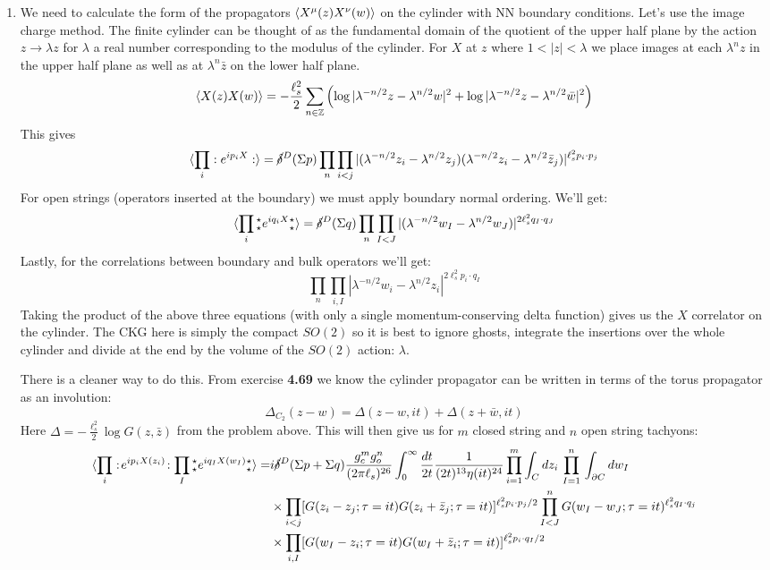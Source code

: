 \documentclass[11pt, class=article, crop=false]{standalone}
\begin{document}
\begin{enumerate}
	\item
	We need to calculate the form of the propagators $\braket{X^\mu(z) X^\nu(w)}$ on the cylinder with NN boundary conditions. Let's use the image charge method. The finite cylinder can be thought of as the fundamental domain of the quotient of the upper half plane by the action $z \to \lambda z$ for $\lambda$ a real number corresponding to the modulus of the cylinder. For $X$ at $z$ where $1<|z|<\lambda$ we place images at each $\lambda^n z$ in the upper half plane as well as at $\lambda^n \bar z$ on the lower half plane. 
	\[
		\braket{X(z) X(w)} = - \frac{\ell_s^2}{2} \sum_{n \in \mathbb{Z}} \left( \log|\lambda^{-n/2} z - \lambda^{n/2} w|^2 +  \log|\lambda^{-n/2} z - \lambda^{n/2} \bar w|^2 \right)
	\]
	This gives
	\[
		\braket{\prod_{i} :e^{i p_i X}:} = \cancel\delta^D(\Sigma p) \prod_{n} \prod_{i < j} |(\lambda^{-n/2} z_i - \lambda^{n/2} z_j) (\lambda^{-n/2} z_i - \lambda^{n/2} \bar z_j)|^{\ell_s^2 p_i \cdot p_j}
	\]
	For open strings (operators inserted at the boundary) we must apply boundary normal ordering. We'll get:
	\[
		\braket{\prod_{i} {_\star^\star} e^{i q_i X} {^\star_\star} } = \cancel\delta^D(\Sigma q) \prod_{n} \prod_{I < J} |(\lambda^{-n/2} w_I - \lambda^{n/2} w_J)|^{2 \ell_s^2 q_I \cdot q_J}
	\]	
	Lastly, for the correlations between boundary and bulk operators we'll get:
	\[
		\prod_n \prod_{i, I} |\lambda^{-n/2} w_i - \lambda^{n/2} z_i|^{2 \ell_s^2 p_i \cdot q_I}
	\]
	Taking the product of the above three equations (with only a single momentum-conserving delta function) gives us the $X$ correlator on the cylinder. The CKG here is simply the compact $SO(2)$ so it is best to ignore ghosts, integrate the insertions over the whole cylinder and divide at the end by the volume of the $SO(2)$ action: $\lambda$. 
	
	There is a cleaner way to do this. From exercise \textbf{4.69} we know the cylinder propagator can be written in terms of the torus propagator as an involution:
	\[
		\Delta_{C_2}(z- w) = \Delta(z - w, i t) + \Delta(z + \bar w, i t)
	\]
	Here $\Delta = -\frac{\ell_s^2}{2} \log G(z, \bar z)$ from the problem above. This will then give us for $m$ closed string and $n$ open string tachyons:
	\[
	\begin{aligned}
		\braket{\prod_{i} :\!e^{i p_i X(z_i)}\!: \prod_{I} {_\star^\star} e^{i q_I X(w_I)} {^\star_\star} } 
		= & i \cancel\delta^D(\Sigma p + \Sigma q) \frac{g_c^m g_o^n}{(2\pi \ell_s)^{26}} \int_0^\infty \frac{dt}{2t} \frac{1}{(2t)^{13} \eta(i t)^{24}} \prod_{i=1}^m \int_{C} dz_i \, \prod_{I=1}^n \, \int_{\partial C} dw_I  \\
		& \times \prod_{i<j} [G(z_i-z_j; \tau = it) G(z_i + \bar z_j; \tau = it)]^{\ell_s^2 p_i \cdot p_j/2}  \prod_{I<J}^n G(w_I-w_J; \tau = it)^{\ell_s^2 q_I \cdot q_j}\\
		& \times \prod_{i, I} [G(w_I - z_i; \tau = it) G(w_I + \bar z_i; \tau = i t)]^{\ell_s^2 p_i \cdot q_I/2}
	\end{aligned}
	\]
	

\end{enumerate}
\end{document}

